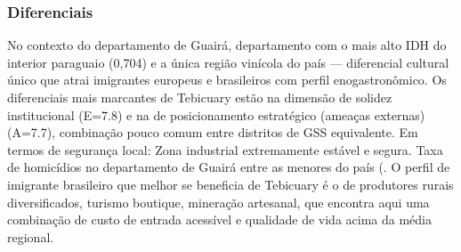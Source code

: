 \subsubsection*{Diferenciais}\label{dif-tebicuary-0418}
No contexto do departamento de Guairá, departamento com o mais alto IDH do interior paraguaio (0,704) e a única região vinícola do país — diferencial cultural único que atrai imigrantes europeus e brasileiros com perfil enogastronômico. Os diferenciais mais marcantes de Tebicuary estão na dimensão de solidez institucional (E=7.8) e na de posicionamento estratégico (ameaças externas) (A=7.7), combinação pouco comum entre distritos de GSS equivalente. Em termos de segurança local: Zona industrial extremamente estável e segura. Taxa de homicídios no departamento de Guairá entre as menores do país (. O perfil de imigrante brasileiro que melhor se beneficia de Tebicuary é o de produtores rurais diversificados, turismo boutique, mineração artesanal, que encontra aqui uma combinação de custo de entrada acessível e qualidade de vida acima da média regional.
